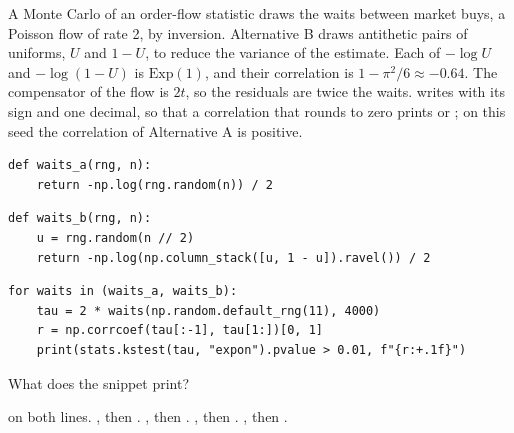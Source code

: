 \begin{question}
\label{question.antitheticWaitsPassTheMargin}
A Monte Carlo of an order-flow statistic draws the waits between market buys,
a Poisson flow of rate 2, by inversion.
Alternative B draws antithetic pairs of uniforms, $U$ and $1-U$,
to reduce the variance of the estimate.
Each of $-\log U$ and $-\log(1-U)$ is $\mathrm{Exp}(1)$,
and their correlation is $1 - \pi^2/6 \approx -0.64$.
The compensator of the flow is $2t$, so the residuals are twice the waits.
 writes  with its sign and one decimal,
so that a correlation that rounds to zero prints  or ;
on this seed the correlation of Alternative A is positive.
\begin{lstlisting}[caption={Alternative A}, label=listing.antitheticWaitsA]
def waits_a(rng, n):
    return -np.log(rng.random(n)) / 2
\end{lstlisting}
\begin{lstlisting}[caption={Alternative B}, label=listing.antitheticWaitsB]
def waits_b(rng, n):
    u = rng.random(n // 2)
    return -np.log(np.column_stack([u, 1 - u]).ravel()) / 2
\end{lstlisting}
\begin{lstlisting}[caption={The margin and the lag-one autocorrelation of the residuals}, label=listing.antitheticWaitsRun]
for waits in (waits_a, waits_b):
    tau = 2 * waits(np.random.default_rng(11), 4000)
    r = np.corrcoef(tau[:-1], tau[1:])[0, 1]
    print(stats.kstest(tau, "expon").pvalue > 0.01, f"{r:+.1f}")
\end{lstlisting}
What does the snippet print?
\begin{choices}
 \choice {} on both lines.
 \choice {}, then .
 \choice {}, then .
 \choice {}, then .
 \correctchoice {}, then .
\end{choices}
\end{question}

